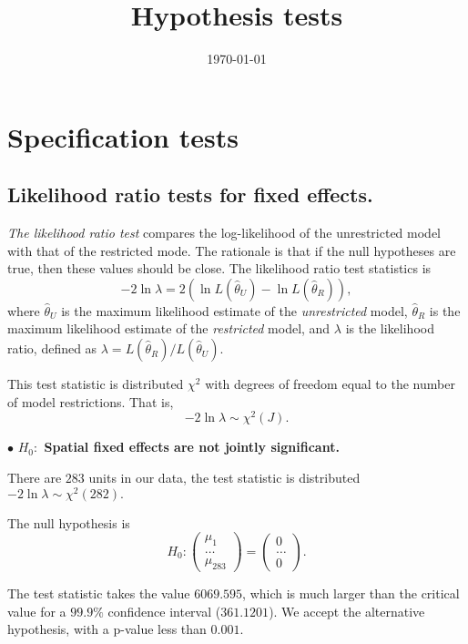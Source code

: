 \documentclass[11pt,a4paper]{amsart}
\theoremstyle{plain}
\theoremstyle{definition}
\begin{document}
\title{Hypothesis tests}
\date{\today}
\maketitle
\tableofcontents
\newpage
		
\section{Specification tests}
\subsection{Likelihood ratio tests for fixed effects. }\hfill\par
		
\textit{The likelihood ratio test} compares the log-likelihood of the unrestricted model with that of the restricted mode. The rationale is that if the null hypotheses are true, then these values should be close. The likelihood ratio test statistics is 
\[	-2 \ln \lambda = 2(\ln L(\hat{\theta}_{U}) - \ln L(\hat{\theta}_{R}) ),	\]
where $\hat{\theta}_{U}$ is the maximum likelihood estimate of the \emph{unrestricted} model, $\hat{\theta}_{R}$ is the maximum likelihood estimate of the \emph{restricted} model, and $\lambda$ is the likelihood ratio, defined as $\lambda = L(\hat{\theta}_{R}) / L(\hat{\theta}_{U})$.
		
This test statistic is distributed $\chi^{2}$ with degrees of freedom equal to the number of model restrictions. That is,
	\[	-2 \ln \lambda \sim \chi^{2}(J).	\]
		
$\bullet$ \textbf{$H_{0}:$ Spatial fixed effects are not jointly significant.} 
		
There are $283$ units in our data, the test statistic is distributed  $-2 \ln \lambda \sim \chi^{2}(282).$
		
The null hypothesis is 
\[	H_{0}: \begin{pmatrix}
		\mu_{1} \\
		\dots \\
		\mu_{283}
\end{pmatrix} = \begin{pmatrix}
		0 \\
		\dots \\
		0
\end{pmatrix}.	\]
		
The test statistic takes the value $6069.595$, which is much larger than the critical value for a $99.9\%$ confidence interval ($361.1201$). We accept the alternative hypothesis,  with a p-value less than $0.001$.
\end{document}
